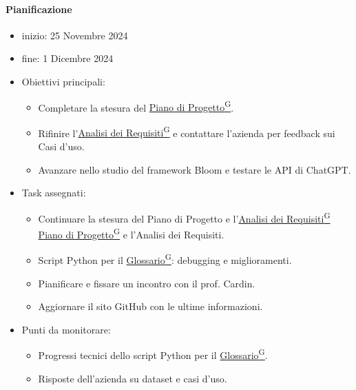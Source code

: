 \documentclass{article}
\begin{document}
                \paragraph{Pianificazione}
                \begin{itemize}
                    \item inizio: 25 Novembre 2024
                    \item fine: 1 Dicembre 2024
                \end{itemize}
                \begin{itemize}
                    \item Obiettivi principali:
                    \begin{itemize}
                        \item Completare la stesura del \href{https://code7crusaders.github.io/docs/RTB/documentazione_interna/glossario.html#piano-di-progetto}{Piano di Progetto\textsuperscript{G}}.
                        \item Rifinire l'\href{https://code7crusaders.github.io/docs/RTB/documentazione_interna/glossario.html#analisi-dei-requisiti}{Analisi dei Requisiti\textsuperscript{G}} e contattare l'azienda per feedback sui Casi d'uso.
                        \item Avanzare nello studio del framework Bloom e testare le API di ChatGPT.
                        \end{itemize}
                    \item Task assegnati:
                    \begin{itemize}
                        \item Continuare la stesura del Piano di Progetto e l'\href{https://code7crusaders.github.io/docs/RTB/documentazione_interna/glossario.html#analisi-dei-requisiti}{Analisi dei Requisiti\textsuperscript{G}} \href{https://code7crusaders.github.io/docs/RTB/documentazione_interna/glossario.html#piano-di-progetto}{Piano di Progetto\textsuperscript{G}} e l'Analisi dei Requisiti.
                        \item Script Python per il \href{https://code7crusaders.github.io/docs/RTB/documentazione_interna/glossario.html#glossario}{Glossario\textsuperscript{G}}: debugging e miglioramenti.
                        \item Pianificare e fissare un incontro con il prof. Cardin.
                        \item Aggiornare il sito GitHub con le ultime informazioni.
                        \end{itemize}
                    \item Punti da monitorare:
                    \begin{itemize}
                        \item Progressi tecnici dello script Python per il \href{https://code7crusaders.github.io/docs/RTB/documentazione_interna/glossario.html#glossario}{Glossario\textsuperscript{G}}.
                        \item Risposte dell'azienda su dataset e casi d'uso.
                        \end{itemize}
                \end{itemize}
\end{document}
